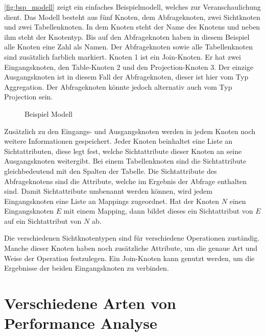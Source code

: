\autoref{fig:bsp_modell} zeigt ein einfaches Beispielmodell, welches zur
Veranschaulichung dient. Das Modell besteht aus fünf Knoten, dem Abfrageknoten,
zwei Sichtknoten und zwei Tabellenknoten. In dem Knoten steht der Name des
Knotens und neben ihm steht der Knotentyp. Bis auf den Abfrageknoten haben in
diesem Beispiel alle Knoten eine Zahl als Namen. Der Abfrageknoten sowie alle
Tabellenknoten sind zusätzlich farblich markiert. Knoten 1 ist ein
\foreignlanguage{english}{Join}-Knoten. Er hat zwei Eingangsknoten,
den \foreignlanguage{english}{Table}-Knoten 2 und den
\foreignlanguage{english}{Projection}-Knoten 3. Der einzige Ausgangsknoten ist in diesem Fall der
Abfrageknoten, dieser ist hier vom Typ \foreignlanguage{english}{Aggregation}.
Der Abfrageknoten könnte jedoch alternativ auch vom Typ \foreignlanguage{english}{Projection} sein. 

\begin{figure}
    \begin{center}
        
    \end{center}
    \caption{Beispiel Modell}\label{fig:bsp_modell}
\end{figure}

Zusätzlich zu den Eingangs- und Ausgangsknoten werden in jedem Knoten
noch weitere Informationen gespeichert. Jeder Knoten beinhaltet
eine Liste an Sichtattributen, diese legt fest, welche Sichtattribute dieser
Knoten an seine Ausgangsknoten weitergibt. Bei einem Tabellenknoten sind die
Sichtattribute gleichbedeutend mit den Spalten der Tabelle. Die Sichtattribute
des Abfrageknotens sind die Attribute, welche im Ergebnis der Abfrage enthalten
sind. Damit Sichtattribute umbenannt werden können, wird jedem Eingangsknoten
eine Liste an Mappings zugeordnet. Hat der Knoten $N$ einen Eingangsknoten $E$
mit einem Mapping, dann bildet dieses ein Sichtattribut von $E$ auf ein
Sichtattribut von $N$ ab.

Die verschiedenen Sichtknotentypen sind für verschiedene Operationen zuständig.
Manche dieser Knoten haben noch zusätzliche Attribute, um die genaue Art und
Weise der Operation festzulegen.
Ein \foreignlanguage{english}{Join}-Knoten kann genutzt werden, um die
Ergebnisse der beiden Eingangsknoten zu verbinden. 


\section{Verschiedene Arten von Performance Analyse}
\label{sec:arten_performance_analyse}
